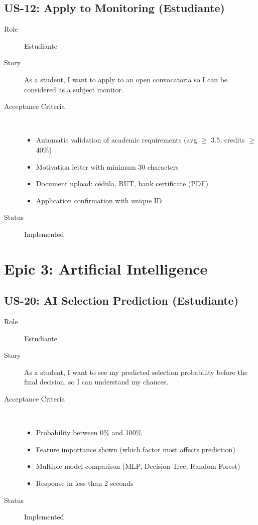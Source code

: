\documentclass[12pt,a4paper]{report}
\begin{document}
\subsection{US-12: Apply to Monitoring (Estudiante)}
\begin{description}
    \item[Role] Estudiante
    \item[Story] As a student, I want to apply to an open convocatoria so I can be considered as a subject monitor.
    \item[Acceptance Criteria] ~
    \begin{itemize}
        \item Automatic validation of academic requirements (avg $\geq$ 3.5, credits $\geq$ 40\%)
        \item Motivation letter with minimum 30 characters
        \item Document upload: cédula, RUT, bank certificate (PDF)
        \item Application confirmation with unique ID
    \end{itemize}
    \item[Status] \textcolor{forestgreen}{\checkmark} Implemented
\end{description}

\section{Epic 3: Artificial Intelligence}

\subsection{US-20: AI Selection Prediction (Estudiante)}
\begin{description}
    \item[Role] Estudiante
    \item[Story] As a student, I want to see my predicted selection probability before the final decision, so I can understand my chances.
    \item[Acceptance Criteria] ~
    \begin{itemize}
        \item Probability between 0\% and 100\%
        \item Feature importance shown (which factor most affects prediction)
        \item Multiple model comparison (MLP, Decision Tree, Random Forest)
        \item Response in less than 2 seconds
    \end{itemize}
    \item[Status] \textcolor{forestgreen}{\checkmark} Implemented
\end{description}
\end{document}
